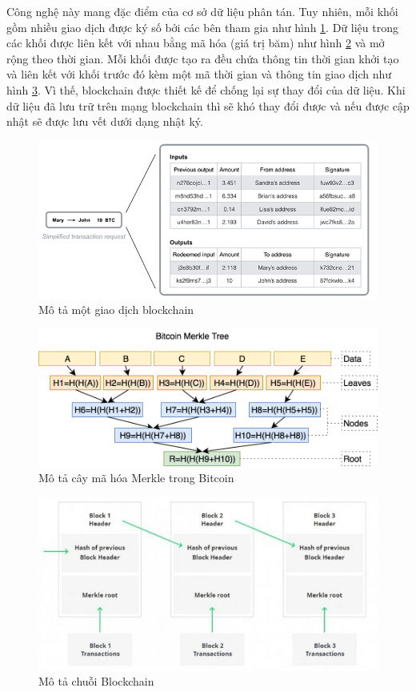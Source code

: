 Công nghệ này mang đặc điểm của cơ sở dữ liệu phân tán. Tuy nhiên, mỗi khối gồm nhiều giao dịch được ký số bởi các bên tham gia như hình \ref{fig:trans_bitcoin}. Dữ liệu trong các khối được liên kết với nhau bằng mã hóa (giá trị băm) như hình \ref{fig:merkle} và mở rộng theo thời gian. Mỗi khối được tạo ra đều chứa thông tin thời gian khởi tạo và liên kết với khối trước đó kèm một mã thời gian và thông tin giao dịch như hình \ref{fig:blockchain}. Vì thế, blockchain được thiết kế để chống lại sự thay đổi của dữ liệu. Khi dữ liệu đã lưu trữ trên mạng blockchain thì sẽ khó thay đổi được và nếu được cập nhật sẽ được lưu vết dưới dạng nhật ký.

\begin{figure}[htbp]
\centering
\includegraphics[width=.9\linewidth]{img/trans_bitcoin.png}
\caption{Mô tả một giao dịch blockchain}
\label{fig:trans_bitcoin}
\end{figure}


\begin{figure}[htbp]
\centering
\includegraphics[width=.9\linewidth]{img/merkle.png}
\caption{Mô tả cây mã hóa Merkle trong Bitcoin}
\label{fig:merkle}
\end{figure}


\begin{figure}[htbp]
\centering
\includegraphics[width=.9\linewidth]{img/blockchain.png}
\caption{Mô tả chuỗi Blockchain}
\label{fig:blockchain}
\end{figure}

